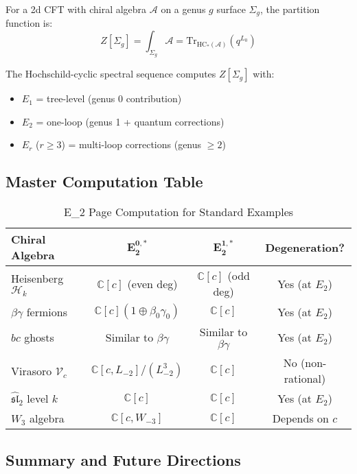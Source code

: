\begin{theorem}
\label{thm:partition-cyclic}
For a 2d CFT with chiral algebra $\mathcal{A}$ on a genus $g$ surface $\Sigma_g$, 
the partition function is:
$$Z[\Sigma_g] = \int_{\Sigma_g} \mathcal{A} = \text{Tr}_{\text{HC}_*(\mathcal{A})}(q^{L_0})$$

The Hochschild-cyclic spectral sequence computes $Z[\Sigma_g]$ with:
\begin{itemize}
\item $E_1$ = tree-level (genus 0 contribution)
\item $E_2$ = one-loop (genus 1 + quantum corrections)
\item $E_r$ ($r \geq 3$) = multi-loop corrections (genus $\geq 2$)
\end{itemize}
\end{theorem}

\subsection{Master Computation Table}

\begin{table}[H]
\centering
\caption{E_2 Page Computation for Standard Examples}
\begin{tabular}{|l|c|c|c|}
\hline
\textbf{Chiral Algebra} & $\mathbf{E_2^{0,*}}$ & $\mathbf{E_2^{1,*}}$ & 
\textbf{Degeneration?} \\
\hline
Heisenberg $\mathcal{H}_k$ & $\mathbb{C}[c]$ (even deg) & $\mathbb{C}[c]$ (odd deg) & 
Yes (at $E_2$) \\
\hline
$\beta\gamma$ fermions & $\mathbb{C}[c](1 \oplus \beta_0\gamma_0)$ & $\mathbb{C}[c]$ & 
Yes (at $E_2$) \\
\hline
$bc$ ghosts & Similar to $\beta\gamma$ & Similar to $\beta\gamma$ & Yes (at $E_2$) \\
\hline
Virasoro $\mathcal{V}_c$ & $\mathbb{C}[c,L_{-2}]/(L_{-2}^3)$ & $\mathbb{C}[c]$ & 
No (non-rational) \\
\hline
$\widehat{\mathfrak{sl}}_2$ level $k$ & $\mathbb{C}[c]$ & $\mathbb{C}[c]$ & Yes (at $E_2$) \\
\hline
$W_3$ algebra & $\mathbb{C}[c,W_{-3}]$ & $\mathbb{C}[c]$ & Depends on $c$ \\
\hline
\end{tabular}
\end{table}

\subsection{Summary and Future Directions}


